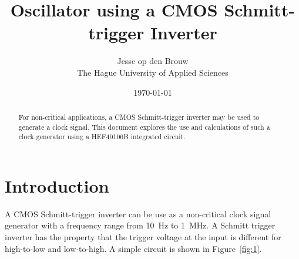 \documentclass[a4paper,12pt]{article}
\author{Jesse op den Brouw\\\normalsize The Hague University of Applied Sciences}
\title{Oscillator using a CMOS Schmitt-trigger Inverter}
\date{\today}
\begin{document}
\maketitle
\vspace*{1cm}
\begin{abstract}
\noindent
For non-critical applications, a CMOS Schmitt-trigger inverter may be used to generate a clock signal. This document explores the use and calculations of such a clock generator using a HEF40106B integrated circuit.
\end{abstract}

\section{Introduction}
A CMOS Schmitt-trigger inverter can be use as a non-critical clock signal generator with a frequency range from \qty{10}{\hertz} to \qty{1}{\mega\hertz}. A Schmitt trigger inverter has the property that the trigger voltage at the input is different for high-to-low and low-to-high. A simple circuit is shown in Figure~\ref{fig:1}.
\end{document}

